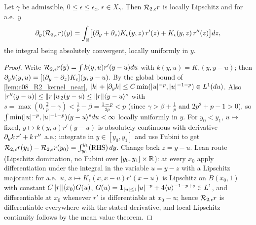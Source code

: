 \begin{lemma}
  \label{lem:c08_R2_derivative}
  Let $\gamma$ be admissible, $0\le\epsilon\le\epsilon_c$, $r\in X_\gamma$. Then $\mathcal{R}_{2,\epsilon}r$ is locally Lipschitz and for a.e.\ $y$
  \[
    \partial_y(\mathcal{R}_{2,\epsilon}r)(y)=\int_{\mathbb{R}}\bigl[(\partial_y+\partial_z)K_\epsilon(y,z)\,r'(z)+K_\epsilon(y,z)\,r''(z)\bigr]dz,
  \]
  the integral being absolutely convergent, locally uniformly in $y$.
\end{lemma}
\begin{proof}
  Write $\mathcal{R}_{2,\epsilon}r(y)=\int k(y,u)r'(y-u)du$ with $k(y,u)=K_\epsilon(y,y-u)$; then
  $\partial_yk(y,u)=[(\partial_y+\partial_z)K_\epsilon](y,y-u)$. By the global bound of \cref{lem:c08_R2_kernel_near},
  $|k|+|\partial_yk|\le C\min(|u|^{-p},|u|^{-1-p})\in L^1(du)$. Also $|r''(y-u)|\le\|r\|w_2(y-u)\le\|r\|\langle y-u \rangle^{s}$ with
  $s=\max(0,\frac2p-\gamma)<\frac1p-\beta=\frac{1-p}{2p}<p$ (since $\gamma>\beta+\frac1p$ and $2p^2+p-1>0$), so
  $\int\min(|u|^{-p},|u|^{-1-p})\langle y-u \rangle^{s}du<\infty$ locally uniformly in $y$. For $y_0<y_1$,
  $u\mapsto$ fixed, $y\mapsto k(y,u)r'(y-u)$ is absolutely continuous with derivative
  $\partial_yk\,r'+k\,r''$ a.e.; integrate in $y\in[y_0,y_1]$ and use Fubini to get
  $\mathcal{R}_{2,\epsilon}r(y_1)-\mathcal{R}_{2,\epsilon}r(y_0)=\int_{y_0}^{y_1}(\text{RHS})\,dy$. Change back $z=y-u$.
  Lean route (Lipschitz domination, no Fubini over $[y_0,y_1]\times\mathbb{R}$): at every $x_0$ apply differentiation under the integral in the variable $u=y-z$ with a Lipschitz majorant: for a.e.\ $u$, $x\mapsto K_\epsilon(x,x-u)r'(x-u)$ is Lipschitz on $B(x_0,1)$ with constant $C\|r\|\langle x_0 \rangle G(u)$, $G(u)=\mathbf 1_{|u|\le1}|u|^{-p}+4\langle u \rangle^{-1-p+s}\in L^1$, and differentiable at $x_0$ whenever $r'$ is differentiable at $x_0-u$; hence $\mathcal{R}_{2,\epsilon}r$ is differentiable everywhere with the stated derivative, and local Lipschitz continuity follows by the mean value theorem.
\end{proof}


